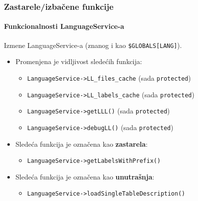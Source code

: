 \begin{frame}[fragile]
	\frametitle{Zastarele/izbačene funkcije}
	\framesubtitle{Funkcionalnosti LanguageService-a}

	Izmene LanguageService-a (znanog i kao \texttt{\$GLOBALS[LANG]}).
	\vspace{0.4cm}
	\begin{itemize}
		\item Promenjena je vidljivost sledećih funkcija:
			\begin{itemize}\smaller
				\item \texttt{LanguageService->LL\_files\_cache} (sada \texttt{protected})
				\item \texttt{LanguageService->LL\_labels\_cache} (sada \texttt{protected})
				\item \texttt{LanguageService->getLLL()} (sada \texttt{protected})
				\item \texttt{LanguageService->debugLL()} (sada \texttt{protected})
			\end{itemize}\normalsize
			\vspace{0.2cm}

		\item Sledeća funkcija je označena kao \textbf{zastarela}:
			\begin{itemize}\smaller
				\item \texttt{LanguageService->getLabelsWithPrefix()}
			\end{itemize}\normalsize
			\vspace{0.2cm}

		\item Sledeća funkcija je označena kao \textbf{unutrašnja}:
			\begin{itemize}\smaller
				\item \texttt{LanguageService->loadSingleTableDescription()}
			\end{itemize}\normalsize
			\vspace{0.2cm}

	\end{itemize}

\end{frame}



